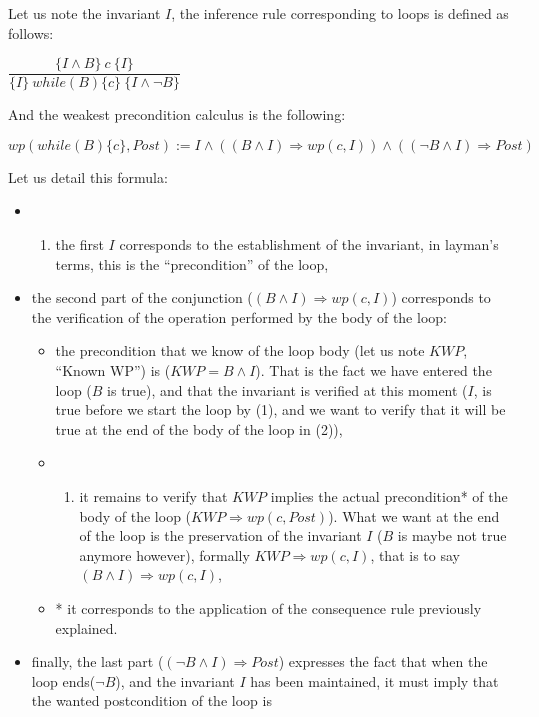 
Let us note the invariant $I$, the inference rule corresponding to
loops is defined as follows:

\begin{center}
$\dfrac{\{I \wedge B \}\ c\ \{I\}}{\{I\}\ while(B)\{c\}\ \{I \wedge \neg B\}}$
\end{center}

And the weakest precondition calculus is the following:

\begin{center}
$wp(while (B) \{ c \}, Post) := I \wedge ((B \wedge I) \Rightarrow wp(c, I)) \wedge ((\neg B \wedge I) \Rightarrow Post)$
\end{center}

Let us detail this formula:

\begin{itemize}
\item
  \begin{enumerate}
  \def\labelenumi{(\arabic{enumi})}
  \item
    the first $I$ corresponds to the establishment of the invariant,
    in layman's terms, this is the ``precondition'' of the loop,
  \end{enumerate}
\item
  the second part of the conjunction
  ($(B \wedge I) \Rightarrow wp(c, I)$) corresponds to the
  verification of the operation performed by the body of the loop:

  \begin{itemize}
  \item
    the precondition that we know of the loop body (let us note $KWP$,
    ``Known WP'') is ($KWP = B \wedge I$). That is the fact we have
    entered the loop ($B$ is true), and that the invariant is verified
    at this moment ($I$, is true before we start the loop by (1), and
    we want to verify that it will be true at the end of the body of the
    loop in (2)),
  \item
    \begin{enumerate}
    \def\labelenumi{(\arabic{enumi})}
    \setcounter{enumi}{1}
    \item
      it remains to verify that $KWP$ implies the actual precondition*
      of the body of the loop ($KWP \Rightarrow wp(c, Post)$). What we
      want at the end of the loop is the preservation of the invariant
      $I$ ($B$ is maybe not true anymore however), formally
      $KWP \Rightarrow wp(c, I)$, that is to say
      $(B \wedge I) \Rightarrow wp(c, I)$,
    \end{enumerate}
  \item
    * it corresponds to the application of the consequence rule
    previously explained.
  \end{itemize}
\item
  finally, the last part ($(\neg B \wedge I) \Rightarrow Post$)
  expresses the fact that when the loop ends($\neg B$), and the
  invariant $I$ has been maintained, it must imply that the wanted
  postcondition of the loop is
\end{itemize}

